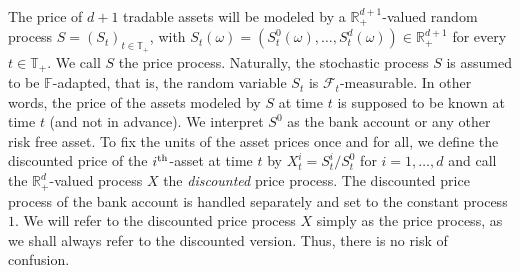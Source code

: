 \documentclass[11pt,a4paper,twoside,openany]{report}
\numberwithin{equation}{section}
\theoremstyle{plain} %
\theoremstyle{definition} %
\theoremstyle{remark} %
\begin{document}
The price of \(d+1\) tradable assets will be modeled by a \(\mathbb{R}_+^{d+1}\)-valued random process \(S = (S_t)_{t\in\mathbb{T}_+}\), with \(S_t(\omega) = (S_t^0(\omega),\dots,S_t^d(\omega))\in \mathbb{R}_+^{d+1}\) for every \(t\in \mathbb{T}_+\). We call \(S\) the price process. Naturally, the stochastic process \(S\) is assumed to be \(\mathbb{F}\)-adapted, that is, the random variable \(S_t\) is \(\mathcal{F}_t\)-measurable. In other words, the price of the assets modeled by \(S\) at time \(t\) is supposed to be known at time \(t\) (and not in advance). We interpret \(S^0\) as the bank account or any other risk free asset. To fix the units of the asset prices once and for all, we define the discounted price of the \(i^{\rm{th}}\)-asset at time \(t\) by \(X_t^{i}=S_t^{i}/S_t^0\) for \(i=1,\dots,d\) and call the \(\mathbb{R}^d_+\)-valued process \(X\) the \textit{discounted} price process. The discounted price process of the bank account is handled separately and set to the constant process \(1\). We will refer to the discounted price process \(X\) simply as the price process, as we shall always refer to the discounted version. Thus, there is no risk of confusion.
\end{document}
